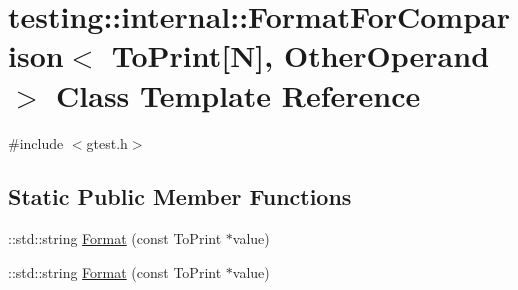 \hypertarget{classtesting_1_1internal_1_1_format_for_comparison_3_01_to_print[_n]_00_01_other_operand_01_4}{\section{testing\-:\-:internal\-:\-:Format\-For\-Comparison$<$ To\-Print\mbox{[}N\mbox{]}, Other\-Operand $>$ Class Template Reference}
\label{classtesting_1_1internal_1_1_format_for_comparison_3_01_to_print[_n]_00_01_other_operand_01_4}
}


{\ttfamily \#include $<$gtest.\-h$>$}

\subsection*{Static Public Member Functions}
\begin{DoxyCompactItemize}
\item 
\-::std\-::string \hyperlink{classtesting_1_1internal_1_1_format_for_comparison_3_01_to_print[_n]_00_01_other_operand_01_4_a76c526461c8fa7df75f7b32ab889b9e0}{Format} (const To\-Print $\ast$value)
\item 
\-::std\-::string \hyperlink{classtesting_1_1internal_1_1_format_for_comparison_3_01_to_print[_n]_00_01_other_operand_01_4_a76c526461c8fa7df75f7b32ab889b9e0}{Format} (const To\-Print $\ast$value)
\end{DoxyCompactItemize}


